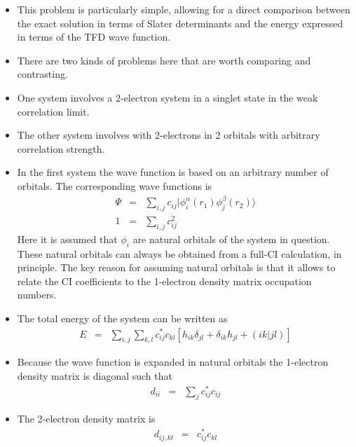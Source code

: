 \documentclass[aip,graphicx]{revtex4-1}
\begin{document}

\begin{itemize}
    \item This problem is particularly simple, allowing for a direct comparison between the exact solution in terms of Slater determinants and the energy expressed in terms of the TFD wave function.
    \item There are two kinds of problems here that are worth comparing and contrasting. 
    \item One system involves a 2-electron system in a singlet state in the weak correlation limit.
    \item The other system involves  with 2-electrons in 2 orbitals with arbitrary correlation strength.
    \item In the first system the wave function is based on an arbitrary number of orbitals. The corresponding wave functions is
    \begin{eqnarray}
        \Psi &=& \sum_{i,j} c_{ij} |\phi^\alpha_i(r_1)\phi^\beta_j(r_2)\rangle \\
        1 &=& \sum_{i,j}c_{ij}^2
    \end{eqnarray}
    Here it is assumed that $\phi_i$ are natural orbitals of the system in question. These natural orbitals can always be obtained from a full-CI calculation, in principle. The key reason for assuming natural orbitals is that it allows to relate the CI coefficients to the 1-electron density matrix occupation numbers.
    \item The total energy of the system can be written as
    \begin{eqnarray}
        E &=& \sum_{i,j}\sum_{k,l}c_{ij}^*c_{kl}\left[
        h_{ik}\delta_{jl} + \delta_{ik}h_{jl} + (ik|jl)
        \right]
    \end{eqnarray}
    \item Because the wave function is expanded in natural orbitals the 1-electron density matrix is diagonal such that
    \begin{eqnarray}
        d_{ii} &=& \sum_j c_{ij}^*c_{ij}
    \end{eqnarray}
    \item The 2-electron density matrix is
    \begin{eqnarray}
        d_{ij,kl} &=& c_{ij}^*c_{kl}
    \end{eqnarray}
\end{itemize}
\end{document}
